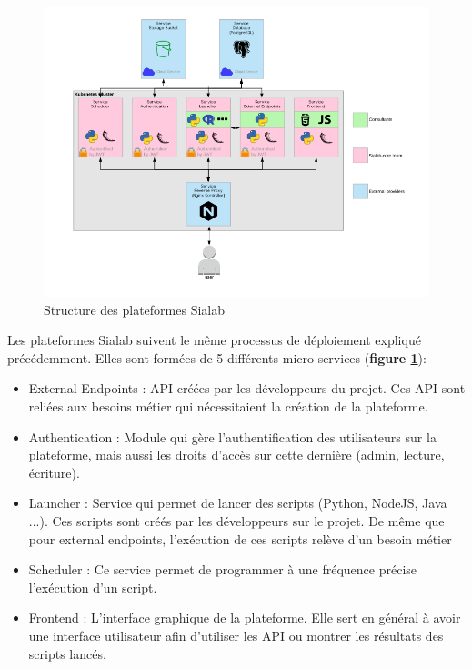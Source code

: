 \documentclass{article} %
\begin{document}
\begin{figure}[!h]
 \centering
 \includegraphics[keepaspectratio = true,scale=0.5]{structure_sia.png}
 \caption{Structure des plateformes Sialab}
 \label{fig:strt}
\end{figure}

Les plateformes Sialab suivent le même processus de déploiement expliqué précédemment. Elles sont formées de 5 différents micro services (\textbf{figure \ref{fig:strt}}):
\begin{itemize}
 \item External Endpoints : API créées par les développeurs du projet. Ces API sont reliées aux besoins métier qui nécessitaient la création de la plateforme. 
 \item Authentication : Module qui gère l'authentification des utilisateurs sur la plateforme, mais aussi les droits d'accès sur cette dernière (admin, lecture, écriture).
 \item Launcher : Service qui permet de lancer des scripts (Python, NodeJS, Java ...). Ces scripts sont créés par les développeurs sur le projet. De même que pour external endpoints, l'exécution de ces scripts relève d'un besoin métier
 \item Scheduler : Ce service permet de programmer à une fréquence précise l'exécution d'un script.
 \item Frontend : L'interface graphique de la plateforme. Elle sert en général à avoir une interface utilisateur afin d'utiliser les API ou montrer les résultats des scripts lancés.
\end{itemize}
\end{document}

